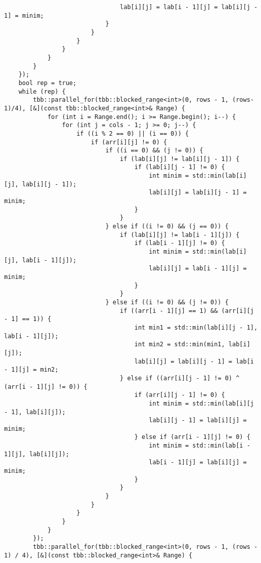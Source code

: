 \documentclass{report}
\begin{document}
\begin{lstlisting}
                                lab[i][j] = lab[i - 1][j] = lab[i][j - 1] = minim;
                            }
                        }
                    }
                }
            }
        }
    });
    bool rep = true;
    while (rep) {
        tbb::parallel_for(tbb::blocked_range<int>(0, rows - 1, (rows-1)/4), [&](const tbb::blocked_range<int>& Range) {
            for (int i = Range.end(); i >= Range.begin(); i--) {
                for (int j = cols - 1; j >= 0; j--) {
                    if ((i % 2 == 0) || (i == 0)) {
                        if (arr[i][j] != 0) {
                            if ((i == 0) && (j != 0)) {
                                if (lab[i][j] != lab[i][j - 1]) {
                                    if (lab[i][j - 1] != 0) {
                                        int minim = std::min(lab[i][j], lab[i][j - 1]);
                                        lab[i][j] = lab[i][j - 1] = minim;
                                    }
                                }
                            } else if ((i != 0) && (j == 0)) {
                                if (lab[i][j] != lab[i - 1][j]) {
                                    if (lab[i - 1][j] != 0) {
                                        int minim = std::min(lab[i][j], lab[i - 1][j]);
                                        lab[i][j] = lab[i - 1][j] = minim;
                                    }
                                }
                            } else if ((i != 0) && (j != 0)) {
                                if ((arr[i - 1][j] == 1) && (arr[i][j - 1] == 1)) {
                                    int min1 = std::min(lab[i][j - 1], lab[i - 1][j]);
                                    int min2 = std::min(min1, lab[i][j]);
                                    lab[i][j] = lab[i][j - 1] = lab[i - 1][j] = min2;
                                } else if ((arr[i][j - 1] != 0) ^ (arr[i - 1][j] != 0)) {
                                    if (arr[i][j - 1] != 0) {
                                        int minim = std::min(lab[i][j - 1], lab[i][j]);
                                        lab[i][j - 1] = lab[i][j] = minim;
                                    } else if (arr[i - 1][j] != 0) {
                                        int minim = std::min(lab[i - 1][j], lab[i][j]);
                                        lab[i - 1][j] = lab[i][j] = minim;
                                    }
                                }
                            }
                        }
                    }
                }
            }
        });
        tbb::parallel_for(tbb::blocked_range<int>(0, rows - 1, (rows - 1) / 4), [&](const tbb::blocked_range<int>& Range) {

\end{lstlisting}
\end{document}
